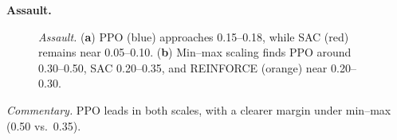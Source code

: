 \noindent \textbf{Assault.}
\begin{figure} 
	\centering
	\quad
	\caption{\emph{Assault.}
		(\textbf{a}) PPO (blue) approaches 0.15--0.18, while SAC (red) remains near 0.05--0.10.
		(\textbf{b}) Min--max scaling finds PPO around 0.30--0.50, SAC 0.20--0.35, and REINFORCE (orange) near 0.20--0.30.}
	\label{fig:assault_combined}
\end{figure}

\noindent
\emph{Commentary.} PPO leads in both scales, with a clearer margin under min--max (0.50 vs.\ 0.35).

\medskip

